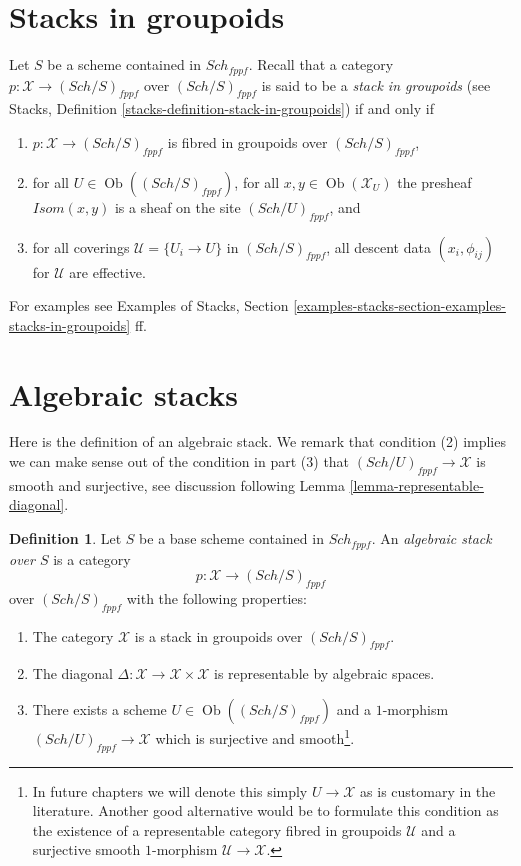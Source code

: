 \documentclass{stacks-project}
\theoremstyle{plain}
\theoremstyle{definition}
\newtheorem{definition}[subsection]{Definition}
\theoremstyle{remark}
\numberwithin{equation}{subsection}
\def\Sch{\mathit{Sch}}
\def\Ob{\mathop{\mathrm{Ob}}\nolimits}
\begin{document}
\section{Stacks in groupoids}
\label{section-stacks}

\noindent
Let $S$ be a scheme contained in $\Sch_{fppf}$.
Recall that a category $p : \mathcal{X} \to (\Sch/S)_{fppf}$
over $(\Sch/S)_{fppf}$ is said to be a
{\it stack in groupoids} (see
Stacks, Definition \ref{stacks-definition-stack-in-groupoids})
if and only if
\begin{enumerate}
\item $p : \mathcal{X} \to (\Sch/S)_{fppf}$ is fibred
in groupoids over $(\Sch/S)_{fppf}$,
\item for all $U \in \Ob((\Sch/S)_{fppf})$,
for all $x, y\in \Ob(\mathcal{X}_U)$ the presheaf
$\mathit{Isom}(x, y)$ is a sheaf on the site $(\Sch/U)_{fppf}$, and
\item for all coverings $\mathcal{U} = \{U_i \to U\}$ in
$(\Sch/S)_{fppf}$, all descent data $(x_i, \phi_{ij})$
for $\mathcal{U}$ are effective.
\end{enumerate}
For examples see
Examples of Stacks,
Section \ref{examples-stacks-section-examples-stacks-in-groupoids}
ff.










\section{Algebraic stacks}
\label{section-algebraic-stacks}

\noindent
Here is the definition of an algebraic stack. We remark that condition
(2) implies we can make sense out of the condition in part (3) that
$(\Sch/U)_{fppf} \to \mathcal{X}$
is smooth and surjective, see discussion following
Lemma \ref{lemma-representable-diagonal}.

\begin{definition}
\label{definition-algebraic-stack}
Let $S$ be a base scheme contained in $\Sch_{fppf}$.
An {\it algebraic stack over $S$} is a category
$$
p : \mathcal{X} \to (\Sch/S)_{fppf}
$$
over $(\Sch/S)_{fppf}$ with the following properties:
\begin{enumerate}
\item The category $\mathcal{X}$ is a stack in groupoids over
$(\Sch/S)_{fppf}$.
\item The diagonal
$\Delta : \mathcal{X} \to \mathcal{X} \times \mathcal{X}$
is representable by algebraic spaces.
\item There exists a scheme $U \in \Ob((\Sch/S)_{fppf})$
and a $1$-morphism $(\Sch/U)_{fppf} \to \mathcal{X}$
which is surjective and smooth\footnote{In future chapters we will denote
this simply $U \to \mathcal{X}$ as is customary in the literature. Another
good alternative would be to formulate this condition as the existence of a
representable category fibred in groupoids $\mathcal{U}$ and a surjective
smooth $1$-morphism $\mathcal{U} \to \mathcal{X}$.}.
\end{enumerate}
\end{definition}
\end{document}
